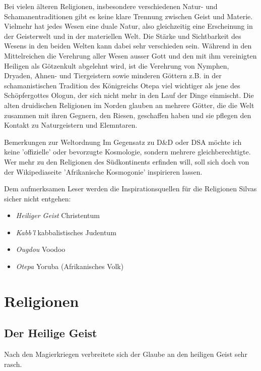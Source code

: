 \documentclass[12pt,twoside,twocolumn,openany]{book}
\begin{document}
	Bei vielen älteren Religionen, insbesondere verschiedenen Natur- und Schamanentraditionen gibt es keine klare Trennung zwischen Geist und Materie. Vielmehr hat jedes Wesen eine duale Natur, also gleichzeitig eine Erscheinung in der Geisterwelt und in der materiellen Welt. Die Stärke und Sichtbarkeit des Wesens in den beiden Welten kann dabei sehr verschieden sein. Während in den Mittelreichen die Verehrung aller Wesen ausser Gott und den mit ihm vereinigten Heiligen als Götzenkult abgelehnt wird, ist die Verehrung von Nymphen, Dryaden, Ahnen- und Tiergeistern sowie minderen Göttern z.B. in der schamanistischen Tradition des Königreichs Otepa viel wichtiger als jene des Schöpfergottes Ologun, der sich nicht mehr in den Lauf der Dinge einmischt. Die alten druidischen Religionen im Norden glauben an mehrere Götter, die die Welt zusammen mit ihren Gegnern, den Riesen, geschaffen haben und sie pflegen den Kontakt zu Naturgeistern und Elemntaren.

\begin{table}[htpb]
	\begin{commentbox}{Bemerkungen zur Weltordnung}
		Im Gegensatz zu D\&D oder DSA möchte ich keine 'offizielle' oder bevorzugte Kosmologie, sondern mehrere gleichberechtigte. Wer mehr zu den Religionen des Südkontinents erfinden will, soll sich doch von der Wikipediaseite 'Afrikanische Kosmogonie' inspirieren lassen.
		
		Dem aufmerksamen Leser werden die Inspirationsquellen für die Religionen Silvas sicher nicht entgehen:
		\begin{itemize}
			\item \emph{Heiliger Geist} Christentum
			\item \emph{Kabb'l} kabbalistisches Judentum
			\item \emph{Ougdou} Voodoo
			\item \emph{Otepa} Yoruba (Afrikanisches Volk)
		\end{itemize}
	\end{commentbox}
\end{table}
	
	

	
\section{Religionen}

 \subsection{Der Heilige Geist}
 Nach den Magierkriegen verbreitete sich der Glaube an den heiligen Geist sehr rasch.
 
\end{document}
